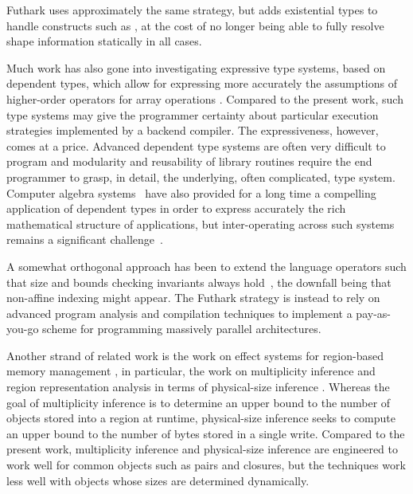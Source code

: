 Futhark uses approximately the same strategy, but adds existential
types to handle constructs such as , at the cost of no
longer being able to fully resolve shape information statically in all
cases.

Much work has also gone into investigating expressive type systems,
based on dependent types, which allow for expressing more accurately
the assumptions of higher-order operators for array operations
\cite{AgdaAccellerate,Trojahner:2008,Trojahner2009643}. Compared to
the present work, such type systems may give the programmer certainty
about particular execution strategies implemented by a backend
compiler. The expressiveness, however, comes at a price. Advanced
dependent type systems are often very difficult to program and
modularity and reusability of library routines require the end
programmer to grasp, in detail, the underlying, often complicated,
type system.  Computer algebra systems~\cite{AXIOM,AldorCAH} have also
provided for a long time a compelling application of dependent types
in order to express accurately the rich mathematical structure of
applications, but inter-operating across such systems remains a
significant challenge~\cite{mapal_synasc,alma:ISSAC}.

A somewhat orthogonal approach has been to extend the language
operators such that size and bounds checking invariants always
hold~\cite{ElsmanDybdal:Array:2014}, the downfall being that
non-affine indexing might appear.  The Futhark strategy is instead to
rely on advanced program analysis and compilation techniques to
implement a pay-as-you-go scheme for programming massively parallel
architectures.

Another strand of related work is the work on effect systems for
region-based memory management \cite{mlkit_retrospective}, in
particular, the work on multiplicity inference and region
representation analysis in terms of physical-size inference
\cite{vejlstrup94,btv96}. Whereas the goal of multiplicity inference
is to determine an upper bound to the number of objects stored into a
region at runtime, physical-size inference seeks to compute an upper
bound to the number of bytes stored in a single write. Compared to the
present work, multiplicity inference and physical-size inference are
engineered to work well for common objects such as pairs and closures,
but the techniques work less well with objects whose sizes are
determined dynamically.

